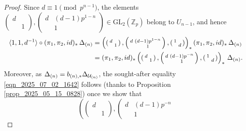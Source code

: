 \documentclass[10pt,a4paper]{amsart}
\newcommand{\ZZ}{\mathbb{Z}}
\begin{document}
\begin{proof}
Since $d\equiv 1 \pmod{p^{n-1}}$, the elements $\left ( \begin{smallmatrix}
    d & \\ & 1
\end{smallmatrix}\right), \left ( \begin{smallmatrix}
    d & (d-1)p^{1-n}\\ & 1
\end{smallmatrix}\right) \in \mathrm{GL}_2(\ZZ_p)$ belong to $U_{n-1}$, and hence
\begin{align*}
    \langle 1,1,d^{-1}\rangle \circ (\pi_1,\pi_2,{\rm id})_*\,\Delta_{(n)} &= \left (\left ( \begin{smallmatrix}
    d & \\ & 1
\end{smallmatrix}\right), \left ( \begin{smallmatrix}
    d & (d-1)p^{1-n}\\ & 1
\end{smallmatrix}\right), \left ( \begin{smallmatrix}
    1 & \\ & d
\end{smallmatrix}\right)\right)_* (\pi_1,\pi_2,{\rm id})_*\,\Delta_{(n)} \\ &= (\pi_1,\pi_2,{\rm id})_* \left (\left ( \begin{smallmatrix}
    d & \\ & 1
\end{smallmatrix}\right), \left ( \begin{smallmatrix}
    d & (d-1)p^{-n}\\ & 1
\end{smallmatrix}\right), \left ( \begin{smallmatrix}
    1 & \\ & d
\end{smallmatrix}\right)\right)_* \,\Delta_{(n)}.
\end{align*}
Moreover, as $\Delta_{(n)} = {\rm b}_{(n),*}\Delta_{\mathcal{U}_{(n)}}$, the sought-after equality \eqref{eqn_2025_07_02_1642} follows (thanks to Proposition \ref{prop_2025_05_15_0828}) once we show that
\begin{equation}
\label{eqn_2025_07_03_1204} 
\left (\left ( \begin{smallmatrix}
    d & \\ & 1
\end{smallmatrix}\right), \left ( \begin{smallmatrix}
    d & (d-1)p^{-n}\\ & 1

\end{smallmatrix}
\end{equation}
\end{proof}
\end{document}
